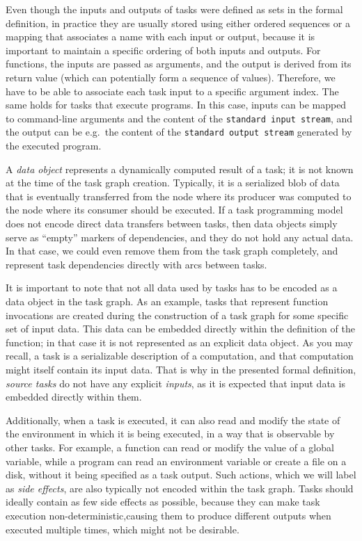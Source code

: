 Even though the inputs and outputs of tasks were defined as sets in the formal definition, in
practice they are usually stored using either ordered sequences or a mapping that associates a name
with each input or output, because it is important to maintain a specific ordering of both inputs
and outputs. For functions, the inputs are passed as arguments, and the output is derived from its
return value (which can potentially form a sequence of values). Therefore, we have to be able to
associate each task input to a specific argument index. The same holds for tasks that execute
programs. In this case, inputs can be mapped to command-line arguments and the content of the
\texttt{standard input stream}, and the output can be e.g.\ the content of the \texttt{standard output stream}
generated by the executed program.

A \emph{data object} represents a dynamically computed result of a task; it is not known at the
time of the task graph creation. Typically, it is a serialized blob of data that is eventually
transferred from the node where its producer was computed to the node where its consumer should be
executed. If a task programming model does not encode direct data transfers between tasks, then
data objects simply serve as ``empty'' markers of dependencies, and they do not hold any actual
data. In that case, we could even remove them from the task graph completely, and represent task
dependencies directly with arcs between tasks.

It is important to note that not all data used by tasks has to be encoded as a data object in the
task graph. As an example, tasks that represent function invocations are created during the
construction of a task graph for some specific set of input data. This data can be embedded
directly within the definition of the function; in that case it is not represented as an explicit
data object. As you may recall, a task is a serializable description of a computation, and that
computation might itself contain its input data. That is why in the presented formal definition,
\emph{source tasks} do not have any explicit \emph{inputs}, as it is expected that
input data is embedded directly within them.

Additionally, when a task is executed, it can also read and modify the state of the environment in
which it is being executed, in a way that is observable by other tasks. For example, a function can
read or modify the value of a global variable, while a program can read an environment variable or
create a file on a disk, without it being specified as a task output. Such actions, which we will
label as \emph{side effects}, are also typically not encoded within the task graph. Tasks should
ideally contain as few side effects as possible, because they can make task execution
non-deterministic,causing them to produce different outputs when executed multiple times, which
might not be desirable.


